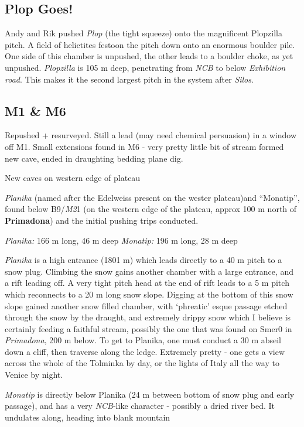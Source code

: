 \hypertarget{plop-goes}{%
\subsection{Plop Goes!}\label{plop-goes}}

Andy and Rik pushed \emph{Plop} (the tight squeeze) onto the magnificent
Plopzilla pitch. A field of helictites festoon the pitch down onto an
enormous boulder pile. One side of this chamber is unpushed, the other
leads to a boulder choke, as yet unpushed. \emph{Plopzilla} is 105 m
deep, penetrating from \emph{NCB} to below \emph{Exhibition road}. This
makes it the second largest pitch in the system after \emph{Silos}.

\hypertarget{m1-m6}{%
\subsection{M1 \& M6}\label{m1-m6}}

Repushed + resurveyed. Still a lead (may need chemical persuasion) in a
window off M1. Small extensions found in M6 - very pretty little bit of
stream formed new cave, ended in draughting bedding plane dig.

New caves on western edge of plateau

\emph{Planika} (named after the Edelweiss present on the wester
plateau)and ``Monatip'', found below B9/\emph{M2}1 (on the western edge
of the plateau, approx 100 m north of \textbf{Primadona}) and the
initial pushing trips conducted.

\emph{Planika:} 166 m long, 46 m deep \emph{Monatip:} 196 m long, 28 m
deep

\emph{Planika} is a high entrance (1801 m) which leads directly to a 40
m pitch to a snow plug. Climbing the snow gains another chamber with a
large entrance, and a rift leading off. A very tight pitch head at the
end of rift leads to a 5 m pitch which reconnects to a 20 m long snow
slope. Digging at the bottom of this snow slope gained another snow
filled chamber, with `phreatic' esque passage etched through the snow by
the draught, and extremely drippy snow which I believe is certainly
feeding a faithful stream, possibly the one that was found on Smer0 in
\emph{Primadona}, 200 m below. To get to Planika, one must conduct a 30
m abseil down a cliff, then traverse along the ledge. Extremely pretty -
one gets a view across the whole of the Tolminka by day, or the lights
of Italy all the way to Venice by night.

\emph{Monatip} is directly below Planika (24 m between bottom of snow
plug and early passage), and has a very \emph{NCB}-like character -
possibly a dried river bed. It undulates along, heading into blank
mountain

